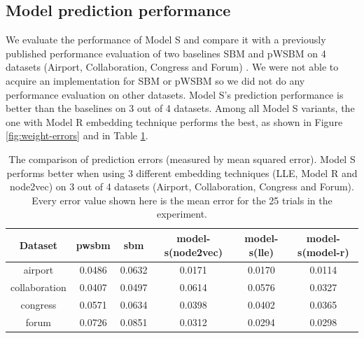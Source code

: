 \documentclass[12pt]{WSUThesis}
\theoremstyle{definition}
\begin{document}
\subsection{Model prediction performance}
We evaluate the performance of Model S and compare it with a previously published performance evaluation of two baselines SBM and pWSBM on 4 datasets (Airport, Collaboration, Congress and Forum) \citep{aicher2014learning}.
We were not able to acquire an implementation for SBM or pWSBM so we did not do any performance evaluation on other datasets.
Model S's prediction performance is better than the baselines on 3 out of 4 datasets.
Among all Model S variants,
the one with Model R embedding technique performs the best,
as shown in Figure \ref{fig:weight-errors} and in Table \ref{tab:weight-errors}.

\begin{table}[!htb]
	\centering
	\caption{
		The comparison of prediction errors (measured by mean squared error).
		Model S performs better when using 3 different embedding techniques (LLE, Model R and node2vec) on 3 out of 4 datasets (Airport, Collaboration, Congress and Forum).
		Every error value shown here is the mean error for the 25 trials in the experiment.
	}
	\begin{tabular}{cccccc} \hline
		Dataset & pwsbm & sbm & model-s(node2vec) & model-s(lle) & model-s(model-r) \\ \hline
		airport & 0.0486 & 0.0632 & 0.0171 & 0.0170 & 0.0114 \\ \hline
		collaboration & 0.0407 & 0.0497 & 0.0614 & 0.0576 & 0.0327 \\ \hline
		congress & 0.0571 & 0.0634 & 0.0398 & 0.0402 & 0.0365 \\ \hline
		forum & 0.0726 & 0.0851 & 0.0312 & 0.0294 & 0.0298 \\ \hline
	\end{tabular}
	\label{tab:weight-errors}
\end{table}
\end{document}
